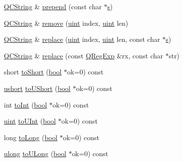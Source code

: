 \begin{DoxyCompactItemize}
\hyperlink{class_q_c_string}{Q\+C\+String} \& \hyperlink{class_q_c_string_a0a6a8fe99e596b149ee15138fa8dcf0c}{prepend} (const char $\ast$\hyperlink{060__command__switch_8tcl_a011c73f2dbb87635a3b4206c72355f6e}{s})
\item 
\hyperlink{class_q_c_string}{Q\+C\+String} \& \hyperlink{class_q_c_string_a20a194da8d31240b28256b6aebd78097}{remove} (\hyperlink{qglobal_8h_a4d3943ddea65db7163a58e6c7e8df95a}{uint} index, \hyperlink{qglobal_8h_a4d3943ddea65db7163a58e6c7e8df95a}{uint} len)
\item 
\hyperlink{class_q_c_string}{Q\+C\+String} \& \hyperlink{class_q_c_string_a08cba3c984525d07704bbdfd42ea6267}{replace} (\hyperlink{qglobal_8h_a4d3943ddea65db7163a58e6c7e8df95a}{uint} index, \hyperlink{qglobal_8h_a4d3943ddea65db7163a58e6c7e8df95a}{uint} len, const char $\ast$\hyperlink{060__command__switch_8tcl_a011c73f2dbb87635a3b4206c72355f6e}{s})
\item 
\hyperlink{class_q_c_string}{Q\+C\+String} \& \hyperlink{class_q_c_string_a7091182ef7ed99948596505fb4666e87}{replace} (const \hyperlink{class_q_reg_exp}{Q\+Reg\+Exp} \&rx, const char $\ast$str)
\item 
short \hyperlink{class_q_c_string_a5b14e5dd6a024889140cf2675d552f55}{to\+Short} (\hyperlink{qglobal_8h_a1062901a7428fdd9c7f180f5e01ea056}{bool} $\ast$ok=0) const 
\item 
\hyperlink{qglobal_8h_ab95f123a6c9bcfee6a343170ef8c5f69}{ushort} \hyperlink{class_q_c_string_acbdae2b3022b84558208c203b5d20077}{to\+U\+Short} (\hyperlink{qglobal_8h_a1062901a7428fdd9c7f180f5e01ea056}{bool} $\ast$ok=0) const 
\item 
int \hyperlink{class_q_c_string_ab0ba83f6435fb7c542d96cafbf775b0d}{to\+Int} (\hyperlink{qglobal_8h_a1062901a7428fdd9c7f180f5e01ea056}{bool} $\ast$ok=0) const 
\item 
\hyperlink{qglobal_8h_a4d3943ddea65db7163a58e6c7e8df95a}{uint} \hyperlink{class_q_c_string_a0b97ba4d0e081852abef451165f69c46}{to\+U\+Int} (\hyperlink{qglobal_8h_a1062901a7428fdd9c7f180f5e01ea056}{bool} $\ast$ok=0) const 
\item 
long \hyperlink{class_q_c_string_ab9615aceec6a03dfa95d346ccbc69c9c}{to\+Long} (\hyperlink{qglobal_8h_a1062901a7428fdd9c7f180f5e01ea056}{bool} $\ast$ok=0) const 
\item 
\hyperlink{qglobal_8h_a718b4eb2652c286f4d42dc18a8e71a1a}{ulong} \hyperlink{class_q_c_string_a281015bf2ce01f1cb4f21f2d70f0d806}{to\+U\+Long} (\hyperlink{qglobal_8h_a1062901a7428fdd9c7f180f5e01ea056}{bool} $\ast$ok=0) const 
\item 

\end{DoxyCompactItemize}

